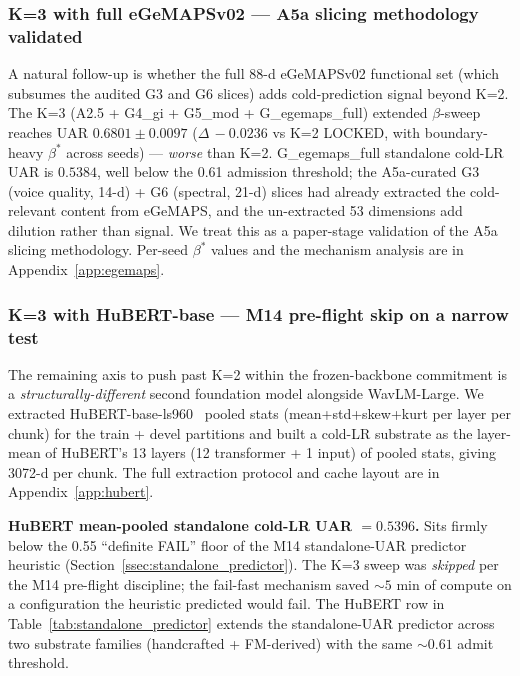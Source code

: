 \subsubsection{K=3 with full eGeMAPSv02 --- A5a slicing methodology validated}

A natural follow-up is whether the full 88-d eGeMAPSv02 functional set (which subsumes the audited G3 and G6 slices) adds cold-prediction signal beyond K=2. The K=3 (A2.5 + G4\_gi + G5\_mod + G\_egemaps\_full) extended $\beta$-sweep reaches UAR $0.6801 \pm 0.0097$ ($\Delta\,-0.0236$ vs K=2 LOCKED, with boundary-heavy $\beta^*$ across seeds) --- \emph{worse} than K=2. G\_egemaps\_full standalone cold-LR UAR is $0.5384$, well below the 0.61 admission threshold; the A5a-curated G3 (voice quality, 14-d) + G6 (spectral, 21-d) slices had already extracted the cold-relevant content from eGeMAPS, and the un-extracted 53 dimensions add dilution rather than signal. We treat this as a paper-stage validation of the A5a slicing methodology. Per-seed $\beta^*$ values and the mechanism analysis are in Appendix~\ref{app:egemaps}.

\subsubsection{K=3 with HuBERT-base --- M14 pre-flight skip on a narrow test}
\label{ssec:k3_hubert}

The remaining axis to push past K=2 within the frozen-backbone commitment is a \emph{structurally-different} second foundation model alongside WavLM-Large. We extracted HuBERT-base-ls960~\cite{hsu2021hubert} pooled stats (mean+std+skew+kurt per layer per chunk) for the train + devel partitions and built a cold-LR substrate as the layer-mean of HuBERT's 13 layers (12 transformer + 1 input) of pooled stats, giving 3072-d per chunk. The full extraction protocol and cache layout are in Appendix~\ref{app:hubert}.

\textbf{HuBERT mean-pooled standalone cold-LR UAR $= 0.5396$.} Sits firmly below the 0.55 ``definite FAIL'' floor of the M14 standalone-UAR predictor heuristic (Section~\ref{ssec:standalone_predictor}). The K=3 sweep was \emph{skipped} per the M14 pre-flight discipline; the fail-fast mechanism saved $\sim 5$ min of compute on a configuration the heuristic predicted would fail. The HuBERT row in Table~\ref{tab:standalone_predictor} extends the standalone-UAR predictor across two substrate families (handcrafted + FM-derived) with the same $\sim 0.61$ admit threshold.

